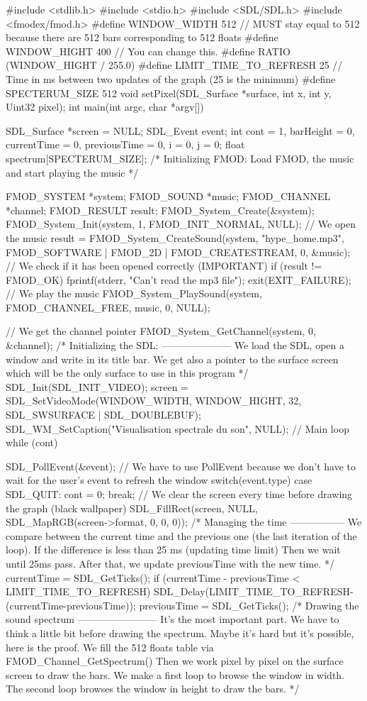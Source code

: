 \begin{Csource}
#include <stdlib.h>
#include <stdio.h>
#include <SDL/SDL.h>
#include <fmodex/fmod.h>
#define WINDOW_WIDTH 512 // MUST stay equal to 512 because there are 512 bars corresponding to 512 floats
#define WINDOW_HIGHT 400 // You can change this.
#define RATIO (WINDOW_HIGHT / 255.0)
#define LIMIT_TIME_TO_REFRESH 25 // Time in ms between two updates of the graph (25 is the minimum)
#define SPECTERUM_SIZE 512
void setPixel(SDL_Surface *surface, int x, int y, Uint32 pixel);
int main(int argc, char *argv[])
{
	SDL_Surface *screen = NULL;
	SDL_Event event;
	int cont = 1, barHeight = 0, currentTime = 0, previousTime = 0, i = 0, j = 0;
	float spectrum[SPECTERUM_SIZE];
	/* Initializing FMOD:
	Load FMOD, the music and start playing the music
	*/
	
	FMOD_SYSTEM *system;
	FMOD_SOUND *music;
	FMOD_CHANNEL *channel;
	FMOD_RESULT result;
	FMOD_System_Create(&system);
	FMOD_System_Init(system, 1, FMOD_INIT_NORMAL, NULL);
	// We open the music
	result = FMOD_System_CreateSound(system, "hype_home.mp3", FMOD_SOFTWARE | FMOD_2D | FMOD_CREATESTREAM, 0, &music);
	// We check if it has been opened correctly (IMPORTANT)
	if (result != FMOD_OK)
	{
		fprintf(stderr, "Can't read the mp3 file\n");
		exit(EXIT_FAILURE);
	}
	// We play the music
	FMOD_System_PlaySound(system, FMOD_CHANNEL_FREE, music, 0, NULL);
	
	// We get the channel pointer
	FMOD_System_GetChannel(system, 0, &channel);
	/*
	Initializing the SDL:
	---------------------
	We load the SDL, open a window and write in its title bar.
	We get also a pointer to the surface screen which will be the only surface to use in this program 
	*/
	SDL_Init(SDL_INIT_VIDEO);
	screen = SDL_SetVideoMode(WINDOW_WIDTH, WINDOW_HIGHT, 32, SDL_SWSURFACE | SDL_DOUBLEBUF);
	SDL_WM_SetCaption("Visualisation spectrale du son", NULL);
	// Main loop	
	while (cont)
	{
		SDL_PollEvent(&event); // We have to use PollEvent because we don't have to wait for the user's event to refresh the window
		switch(event.type)
		{
			case SDL_QUIT:
			cont = 0;
			break;
		}
		// We clear the screen every time before drawing the graph (black wallpaper)
		SDL_FillRect(screen, NULL, SDL_MapRGB(screen->format, 0, 0, 0));
		/* Managing the time
		-----------------
		We compare between the current time and the previous one (the last iteration of the loop).
		If the difference is less than 25 ms (updating time limit)
		Then we wait until 25ms pass.
		After that, we update previousTime with the new time. */
		currentTime = SDL_GetTicks();
		if (currentTime - previousTime < LIMIT_TIME_TO_REFRESH)
		{
			SDL_Delay(LIMIT_TIME_TO_REFRESH-(currentTime-previousTime));
		}
		previousTime = SDL_GetTicks();
		/* Drawing the sound spectrum
		------------------------
		It's the most important part. We have to think a little bit before drawing the spectrum. Maybe it's hard but it's possible, here is the proof.
		We fill the 512 floats table via FMOD_Channel_GetSpectrum()
		Then we work pixel by pixel on the surface screen to draw the bars.
		We make a first loop to browse the window in width.
		The second loop browses the window in height to draw the bars.
		*/
		
}}
\end{Csource}
